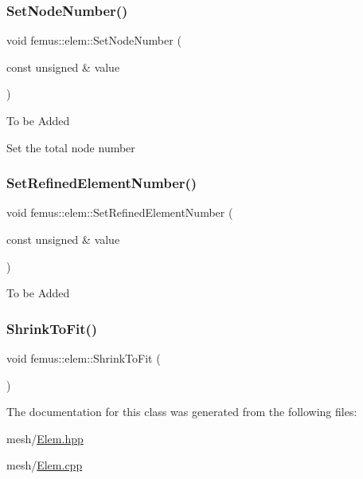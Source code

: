 \mbox{\label{classfemus_1_1elem_abbd019c7345566a2b7329d164d536df7}} 
\subsubsection{\texorpdfstring{Set\+Node\+Number()}{SetNodeNumber()}}
{\footnotesize\ttfamily void femus\+::elem\+::\+Set\+Node\+Number (\begin{DoxyParamCaption}\item[{const unsigned \&}]{value }\end{DoxyParamCaption})}

To be Added

Set the total node number \mbox{\label{classfemus_1_1elem_a95a27cdaa1c8dd49a7573fc313bf38c3}} 
\subsubsection{\texorpdfstring{Set\+Refined\+Element\+Number()}{SetRefinedElementNumber()}}
{\footnotesize\ttfamily void femus\+::elem\+::\+Set\+Refined\+Element\+Number (\begin{DoxyParamCaption}\item[{const unsigned \&}]{value }\end{DoxyParamCaption})\hspace{0.3cm}{\ttfamily [inline]}}

To be Added \mbox{\label{classfemus_1_1elem_afa830dc9dc77d5292d126bf0156f5330}} 
\subsubsection{\texorpdfstring{Shrink\+To\+Fit()}{ShrinkToFit()}}
{\footnotesize\ttfamily void femus\+::elem\+::\+Shrink\+To\+Fit (\begin{DoxyParamCaption}{ }\end{DoxyParamCaption})}



The documentation for this class was generated from the following files\+:\begin{DoxyCompactItemize}
\item 
mesh/\mbox{\hyperlink{_elem_8hpp}{Elem.\+hpp}}\item 
mesh/\mbox{\hyperlink{_elem_8cpp}{Elem.\+cpp}}\end{DoxyCompactItemize}
